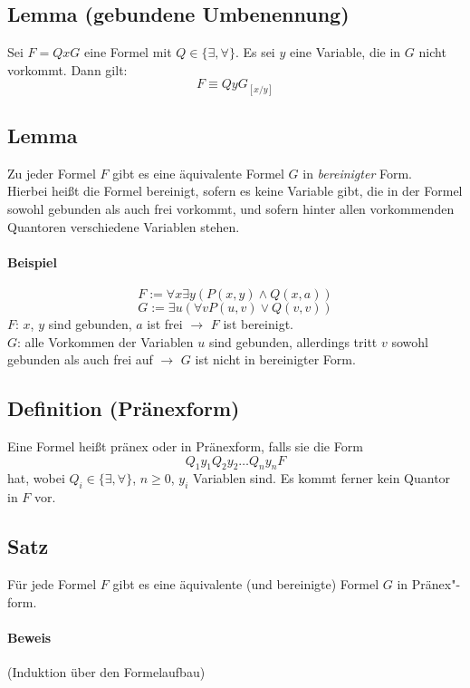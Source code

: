 \documentclass[a4paper]{scrartcl}
\begin{document}
\subsection{Lemma (gebundene Umbenennung)}

Sei $F = QxG$ eine Formel mit $Q\in \{\exists, \forall\}$. Es sei $y$ eine Variable, die in $G$ nicht vorkommt. Dann gilt:
$$F\equiv QyG_{[x/y]}$$

\subsection{Lemma}

Zu jeder Formel $F$ gibt es eine äquivalente Formel $G$ in \emph{bereinigter} Form.\\ Hierbei heißt die Formel bereinigt, sofern es keine Variable gibt, die in der Formel sowohl gebunden als auch frei vorkommt, und sofern hinter allen vorkommenden Quantoren verschiedene Variablen stehen.

\paragraph{Beispiel}

$$F:=\forall x\exists y(P(x,y)\wedge Q(x,a))$$
$$G:=\exists u(\forall vP(u,v)\vee Q(v,v))$$
$F$: $x$, $y$ sind gebunden, $a$ ist frei $\rightarrow$ $F$ ist bereinigt. \\
$G$: alle Vorkommen der Variablen $u$ sind gebunden, allerdings tritt $v$ sowohl gebunden als auch frei auf $\rightarrow$ $G$ ist nicht in bereinigter Form.

\subsection{Definition (Pränexform)}

Eine Formel heißt pränex oder in Pränexform, falls sie die Form $$Q_1y_1Q_2y_2\ldots Q_ny_nF$$ hat, wobei $Q_i\in\{\exists, \forall\}$, $n\geq0$, $y_i$ Variablen sind. Es kommt ferner kein Quantor in $F$ vor.

\subsection{Satz}

Für jede Formel $F$ gibt es eine äquivalente (und bereinigte) Formel $G$ in Pränex"-form.

\paragraph{Beweis} (Induktion über den Formelaufbau)
\end{document}
